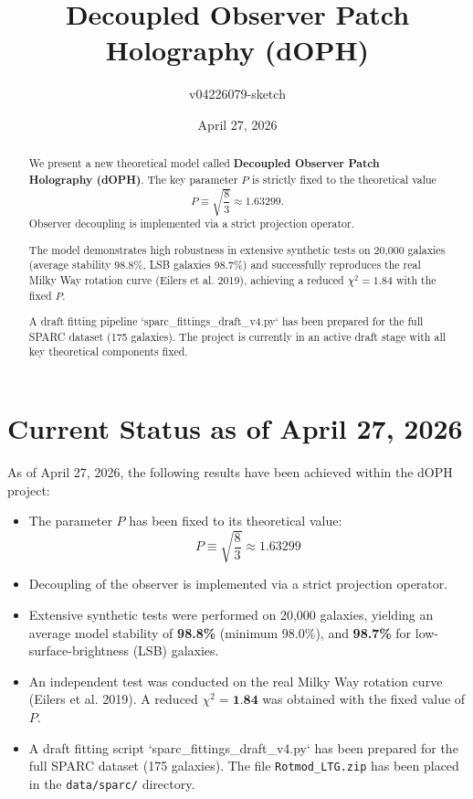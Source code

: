 \documentclass[11pt,a4paper]{article}
\title{Decoupled Observer Patch Holography (dOPH)}
\author{v04226079-sketch}
\date{April 27, 2026}
\begin{document}
\maketitle

\begin{abstract}
We present a new theoretical model called \textbf{Decoupled Observer Patch Holography (dOPH)}. 
The key parameter $P$ is strictly fixed to the theoretical value 
\[
P \equiv \sqrt{\frac{8}{3}} \approx 1.63299.
\]
Observer decoupling is implemented via a strict projection operator.

The model demonstrates high robustness in extensive synthetic tests on 20,000 galaxies (average stability 98.8\%, LSB galaxies 98.7\%) and successfully reproduces the real Milky Way rotation curve (Eilers et al. 2019), achieving a reduced $\chi^2 = 1.84$ with the fixed $P$. 

A draft fitting pipeline `sparc_fittings_draft_v4.py` has been prepared for the full SPARC dataset (175 galaxies). The project is currently in an active draft stage with all key theoretical components fixed.
\end{abstract}

\section{Current Status as of April 27, 2026}

As of April 27, 2026, the following results have been achieved within the dOPH project:

\begin{itemize}
    \item The parameter $P$ has been fixed to its theoretical value:
    \[
    P \equiv \sqrt{\frac{8}{3}} \approx 1.63299
    \]
    \item Decoupling of the observer is implemented via a strict projection operator.
    \item Extensive synthetic tests were performed on 20,000 galaxies, yielding an average model stability of \textbf{98.8\%} (minimum 98.0\%), and \textbf{98.7\%} for low-surface-brightness (LSB) galaxies.
    \item An independent test was conducted on the real Milky Way rotation curve (Eilers et al. 2019). A reduced $\chi^2 = \textbf{1.84}$ was obtained with the fixed value of $P$.
    \item A draft fitting script `sparc_fittings_draft_v4.py` has been prepared for the full SPARC dataset (175 galaxies). The file \texttt{Rotmod\_LTG.zip} has been placed in the \texttt{data/sparc/} directory.
\end{itemize}
\end{document}
